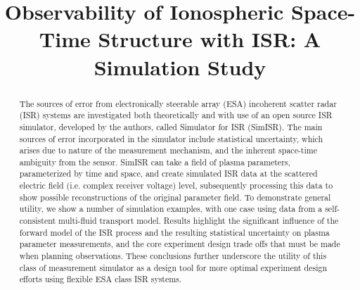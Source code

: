 \documentclass[draft,ras]{agutex}
\begin{document}
%
%


\title{Observability of Ionospheric Space-Time Structure with ISR:   A Simulation Study }

%
%


\begin{abstract}

The sources of error from electronically steerable array (ESA) incoherent scatter radar (ISR) systems are investigated both theoretically and with use of an open source ISR simulator, developed by the authors, called Simulator for ISR (SimISR). The main sources of error incorporated in the simulator include statistical uncertainty, which arises due to nature of the measurement mechanism, and the inherent space-time ambiguity from the sensor. SimISR can take a field of plasma parameters, parameterized by time and space, and create simulated ISR data at the scattered electric field (i.e. complex receiver voltage) level, subsequently processing this data to show possible reconstructions of the original parameter field. To demonstrate general utility, we show a number of simulation examples, with one case using data from a self-consistent multi-fluid transport model. Results highlight the significant influence of the forward model of the ISR process and the resulting statistical uncertainty on plasma parameter measurements, and the core experiment design trade offs that must be made when planning observations. These conclusions further underscore the utility of this class of measurement simulator as a design tool for more optimal experiment design efforts using flexible ESA class ISR systems.


\end{abstract}
\end{document}
